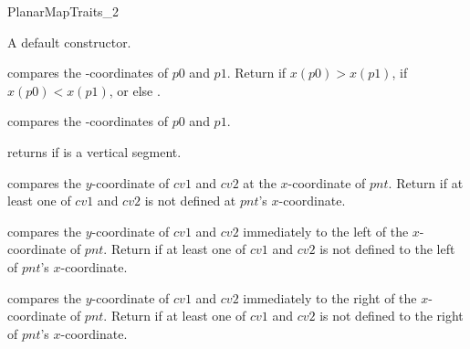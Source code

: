 \begin{ccRefConcept}{PlanarMapTraits_2}
    
    

    

\ccCreation
    

    {A default constructor.}

    \ccOperations

     {compares the -coordinates
       of $p0$ and $p1$.  Return  if $x(p0) >
       x(p1)$,  if $x(p0) < x(p1)$, or else
       .  }
    
     {compares the
       -coordinates of $p0$ and $p1$.}


   {returns  if  is a vertical segment.}
        
    
    {compares the $y$-coordinate of $cv1$ and $cv2$ at the $x$-coordinate 
     of $pnt$. Return  if at least one of $cv1$ and $cv2$  
     is not defined at $pnt$'s $x$-coordinate.}
   
  {compares the $y$-coordinate of $cv1$ and $cv2$ immediately to the
     left of the $x$-coordinate of $pnt$. Return 
     if at least one of $cv1$ and $cv2$ is not defined to the left of $pnt$'s
     $x$-coordinate.}
    
   {compares the $y$-coordinate of $cv1$ and
     $cv2$ immediately to the right of the $x$-coordinate of $pnt$.
     Return  if at least one of $cv1$ and $cv2$ is
     not defined to the right of $pnt$'s $x$-coordinate.}


\end{ccRefConcept}
